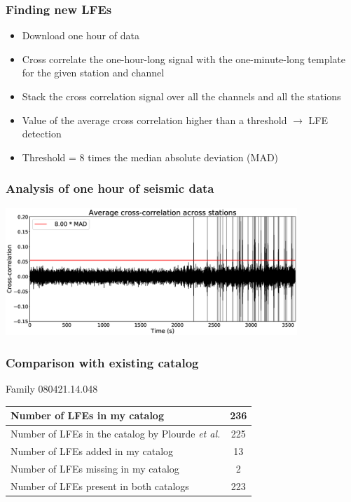 \documentclass{beamer}
\begin{document}
	\begin{frame}
		\frametitle{Finding new LFEs}
		\begin{itemize}
			\item Download one hour of data
			\item Cross correlate the one-hour-long signal with the one-minute-long template for the given station and channel
			\item Stack the cross correlation signal over all the channels and all the stations
			\item Value of the average cross correlation higher than a threshold $\rightarrow$ LFE detection
			\item Threshold = 8 times the median absolute deviation (MAD)
		\end{itemize}
	\end{frame}

	\begin{frame}
		\frametitle{Analysis of one hour of seismic data}
		\begin{center}
			\includegraphics[width=11cm, trim={0cm 0cm 0cm 0cm}, clip]{catalog_SC/20080421_130000.eps}
		\end{center}
	\end{frame}

	\begin{frame}
		\frametitle{Comparison with existing catalog}
		\begin{center}
		Family 080421.14.048

		\vspace{2em}

		\begin{tabular}{| l | c |}
			\hline
			Number of LFEs in my catalog & 236 \\
			\hline
			Number of LFEs in the catalog by Plourde \textit{et al.} & 225 \\
			\hline
			Number of LFEs added in my catalog & 13 \\
			\hline
			Number of LFEs missing in my catalog & 2 \\
			\hline
			Number of LFEs present in both catalogs & 223 \\
			\hline
		\end{tabular}
		\end{center}
	\end{frame}
\end{document}
